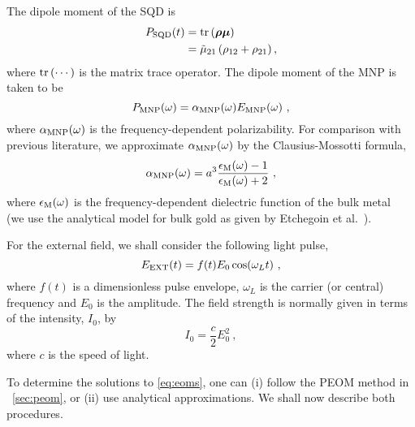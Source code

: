 The dipole moment of the SQD is
%
\begin{align}
    \psqd(t) &= \trace{\bm\rho\bm\mu} \\
    &= \mut\left( \rho_{12} + \rho_{21} \right) ,
    \label{eq:psqdt}
\end{align}
%
where $\text{tr}\left(\cdots\right)$ is the matrix trace operator. The dipole moment of the
MNP is taken to be
%
\begin{equation}
    \pmnp(\omega) = \alphamnp(\omega)\emnp(\omega) \ ,
    \label{eq:pmnpw}
\end{equation}
%
where $\alpha_\text{MNP}(\omega)$ is the frequency-dependent polarizability.
For comparison with previous literature, we approximate $\alpha_\text{MNP}(\omega)$ by
the Clausius-Mossotti formula,
%
\begin{equation}
    \alphamnp(\omega) = a^3 \frac{\epsm(\omega)-1\epsb}{
    \epsm(\omega) + 2\epsb} \ ,
    \label{eq:alpha_mnp}
\end{equation}
%
where $\epsilon_{\text{M}}(\omega)$ is the frequency-dependent dielectric function of the
bulk metal~\cite{landau_electrodynamics_1984} (we use the analytical model for
bulk gold as given by Etchegoin et al.~\cite{etchegoin_analytic_2006}).

For the external field, we shall consider the following light pulse,
%
\begin{equation}
    \eext(t) = f(t) E_0 \cos(\omega_L t) \ ,
    \label{eq:pulse_general}
\end{equation}
%
where $f(t)$ is a dimensionless pulse envelope, $\omega_L$ is the carrier (or
central) frequency and $E_0$ is the amplitude. The field strength is normally
given in terms of the intensity, $I_0$, by
%
\begin{equation}
    I_0 = \frac{c}{2}E_0^2 \ ,
    \label{eq:intensity}
\end{equation}
%
where $c$ is the speed of light. 

To determine the solutions to \cref{eq:eoms}, one can (i) follow the PEOM
method in ~\cref{sec:peom}, or (ii) use analytical approximations. We shall now
describe both procedures.
